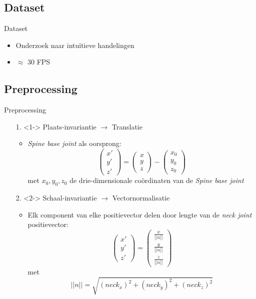 \documentclass[]{beamer}
\begin{document}
	\subsection{Dataset}
	\begin{frame}{Dataset}
		\begin{itemize}
			\item Onderzoek naar intuïtieve handelingen  
			\item $\approx$ 30 FPS
		\end{itemize}
	\end{frame}
	\subsection{Preprocessing}
	\begin{frame}{Preprocessing}
		\begin{enumerate}
			\item[1.]<1-> Plaats-invariantie $\rightarrow$ Translatie
			\begin{itemize}
				\item \textit{Spine base joint} als oorsprong:
				$$\begin{pmatrix}
				x' \\
				y' \\
				z'
				\end{pmatrix}
				= \begin{pmatrix}
				x \\ y \\ z
				\end{pmatrix}
				- \begin{pmatrix}
				x_0 \\ y_0 \\ z_0
				\end{pmatrix}$$
				met $x_0, y_0, z_0$ de drie-dimensionale coördinaten van de \textit{Spine base joint}
			\end{itemize}
			\item[2.]<2-> Schaal-invariantie $\rightarrow$ Vectornormalisatie 
			\begin{itemize}
				\item Elk component van elke positievector delen door lengte van de \textit{neck joint} positievector:
				$$
				\begin{pmatrix}
				x' \\ y' \\ z'
				\end{pmatrix}
				=				
				\begin{pmatrix}
				\frac{x}{||n||} \\ \frac{y}{||n||}  \\ \frac{z}{||n||} 
				\end{pmatrix}
				$$
				met $$||n|| = \sqrt{(neck_x)^2 + (neck_y)^2 + (neck_z)^2}$$
			\end{itemize}
		\end{enumerate}
	\end{frame}
\end{document}
